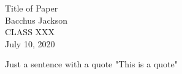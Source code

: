 \documentclass[12pt]{report}
\def \paperauthor {Bacchus Jackson}
\def \papertitle {Title of Paper}
\def \paperclass {CLASS XXX}
\def \paperdate {July 10, 2020}
\begin{document}
    

\begin{center}
    \vspace*{45mm}
    \papertitle\\
    \vspace*{85mm}
    \paperauthor\\
    \paperclass\\
    \paperdate
\end{center}

\newpage

\setcounter{page}{1}
\fancyhead[R]{\thepage}

Just a sentence with a quote "This is a quote" \autocite{thomas}

\lipsum[4]

\printbibliography
\end{document}
